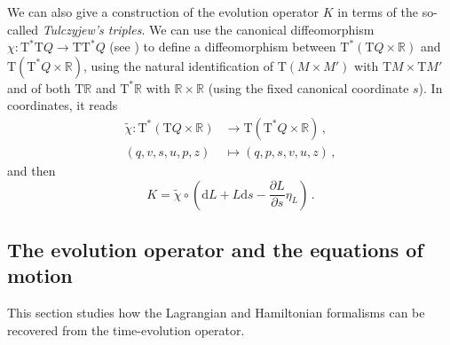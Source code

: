 \documentclass[11pt]{article}
\theoremstyle{plain}
\theoremstyle{definition}
\newcommand{\R}{\mathbb{R}}
\renewcommand{\d}{\mathrm{d}}
\newcommand{\T}{{\mathrm T}}
\let\Tan\T
\newcommand{\parder}[2]{\frac{\partial #1}{\partial #2}}
\def\d{\mathrm{d}}
\def\d{\mathrm{d}}
\def\Tan{\mathrm{T}}
\begin{document}
We can also give a construction of the evolution operator $K$ in terms of the so-called \textsl{Tulczyjew's triples}. 
We can use the canonical diffeomorphism
$\chi\colon \Tan^*\Tan Q \longrightarrow \Tan\Tan^* Q$ (see \cite{Tul_1976b})
to define a diffeomorphism between 
$\Tan^* (\Tan Q \times \R)$ and 
$\T (\T^* Q \times \R)$, 
using the natural identification of 
$\Tan (M \times M')$ with $\T M \times \T M'$ 
and of both 
$\Tan \R$ and $\Tan^* \R$ with $\R \times \R$ 
(using the fixed canonical coordinate $s$). 
In coordinates, it reads
\begin{align}
    \widetilde \chi\colon \Tan^*(\Tan Q\times \R) &\longrightarrow \Tan(\Tan^* Q\times \R)\,,
    \\
    (q,v,s,u,p,z)&\longmapsto (q,p,s,v,u,z) \,, 
\end{align}
and then
$$K = \widetilde\chi\circ \left(\d L + L\d s -\parder{L}{s}\eta_L\right)\,.$$


\subsection{The evolution operator and the equations of motion}

This section studies how the Lagrangian and Hamiltonian formalisms can be recovered from the time-evolution operator.
\end{document}
